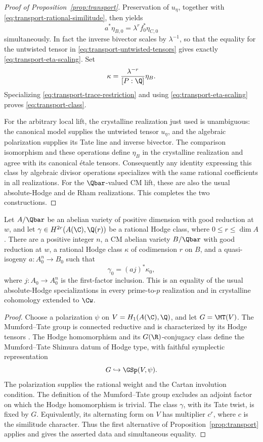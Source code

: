 \begin{proof}[Proof of Proposition~\ref{prop:transport}]
Preservation of $u_\eta$, together with
\eqref{eq:transport-rational-similitude}, then yields
\begin{equation}
 a^*\eta_{B,0}=\lambda^r f_0^*\eta_{C,0}
 \label{eq:transport-eta-scaling}
\end{equation}
simultaneously.  In fact the inverse bivector scales by
$\lambda^{-1}$, so that the equality for the untwisted tensor
in \eqref{eq:transport-untwisted-tensors} gives exactly
\eqref{eq:transport-eta-scaling}.  Set
\[
 \kappa=\frac{\lambda^{-r}}{[P:\Q]}\eta_B.
\]
Specializing \eqref{eq:transport-trace-restriction} and using
\eqref{eq:transport-eta-scaling} proves
\eqref{eq:transport-class}.

For the arbitrary local lift, the crystalline realization just
used is unambiguous: the canonical model supplies the untwisted
tensor $u_\eta$, and the algebraic polarization supplies its Tate
line and inverse bivector.  The comparison isomorphism and these
operations define $\eta_B$ in the crystalline realization and
agree with its canonical \'{e}tale tensors.  Consequently any
identity expressing this class by algebraic divisor operations
specializes with the same rational coefficients in all
realizations.  For the $\Qbar$-valued CM lift, these are also the
usual absolute-Hodge and de Rham realizations.  This completes
the two constructions.
\end{proof}

\begin{corollary}
\label{cor:cm-transport}
Let \(A/\Qbar\) be an abelian variety of positive dimension with
good reduction at \(w\), and let
\(\gamma\in H^{2r}(A(\C),\Q(r))\) be a rational Hodge class,
where \(0\leq r\leq\dim A\). There are a positive integer \(n\),
a CM abelian variety \(B/\Qbar\) with good reduction at \(w\),
a rational Hodge class \(\kappa\) of codimension \(r\) on \(B\),
and a quasi-isogeny \(a:A_0^n\to B_0\) such that
\[
 \gamma_0=(aj)^*\kappa_0,
\]
where \(j:A_0\to A_0^n\) is the first-factor inclusion. This is an
equality of the usual absolute-Hodge specializations in every
prime-to-\(p\) realization and in crystalline cohomology extended
to \(\Cw\).
\end{corollary}

\begin{proof}
Choose a polarization \(\psi\) on \(V=H_1(A(\C),\Q)\), and let
\(G=\MT(V)\). The Mumford--Tate group is connected reductive and
is characterized by its Hodge tensors
\cite[Section~3, Propositions~3.4 and~3.6]{Deligne1982}.
The Hodge homomorphism and its \(G(\R)\)-conjugacy class define
the Mumford--Tate Shimura datum of Hodge type, with faithful
symplectic representation
\[
 G\hookrightarrow\GSp(V,\psi).
\]
The polarization supplies the rational weight and the Cartan
involution condition. The definition of the Mumford--Tate group
excludes an adjoint factor on which the Hodge homomorphism is
trivial. The class \(\gamma\), with its Tate twist, is fixed by
\(G\). Equivalently, its alternating form on \(V\) has multiplier
\(c^r\), where \(c\) is the similitude character. Thus the first
alternative of Proposition~\ref{prop:transport} applies and gives
the asserted data and simultaneous equality.
\end{proof}
